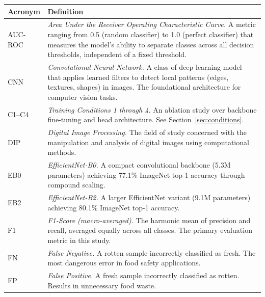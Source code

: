 \documentclass[12pt, a4paper]{article}
\begin{document}
\begin{table}[h]
\begin{tabular}{L{2.5cm} L{11cm}}
\toprule
\textbf{Acronym} & \textbf{Definition} \\
\midrule

AUC-ROC & \textit{Area Under the Receiver Operating Characteristic Curve.}
          A metric ranging from 0.5 (random classifier) to 1.0 (perfect
          classifier) that measures the model's ability to separate classes
          across all decision thresholds, independent of a fixed threshold. \\[4pt]

CNN     & \textit{Convolutional Neural Network.}
          A class of deep learning model that applies learned filters to
          detect local patterns (edges, textures, shapes) in images.
          The foundational architecture for computer vision tasks. \\[4pt]

C1--C4  & \textit{Training Conditions 1 through 4.}
          An ablation study over backbone fine-tuning and head architecture.
          See Section~\ref{sec:conditions}. \\[4pt]

DIP     & \textit{Digital Image Processing.}
          The field of study concerned with the manipulation and analysis
          of digital images using computational methods. \\[4pt]

EB0     & \textit{EfficientNet-B0.}
          A compact convolutional backbone (5.3M parameters) achieving
          77.1\% ImageNet top-1 accuracy through compound scaling. \\[4pt]

EB2     & \textit{EfficientNet-B2.}
          A larger EfficientNet variant (9.1M parameters) achieving
          80.1\% ImageNet top-1 accuracy. \\[4pt]

F1      & \textit{F1-Score (macro-averaged).}
          The harmonic mean of precision and recall, averaged equally
          across all classes. The primary evaluation metric in this study. \\[4pt]

FN      & \textit{False Negative.}
          A rotten sample incorrectly classified as fresh.
          The most dangerous error in food safety applications. \\[4pt]

FP      & \textit{False Positive.}
          A fresh sample incorrectly classified as rotten.
          Results in unnecessary food waste. \\[4pt]


\end{tabular}
\end{table}
\end{document}
